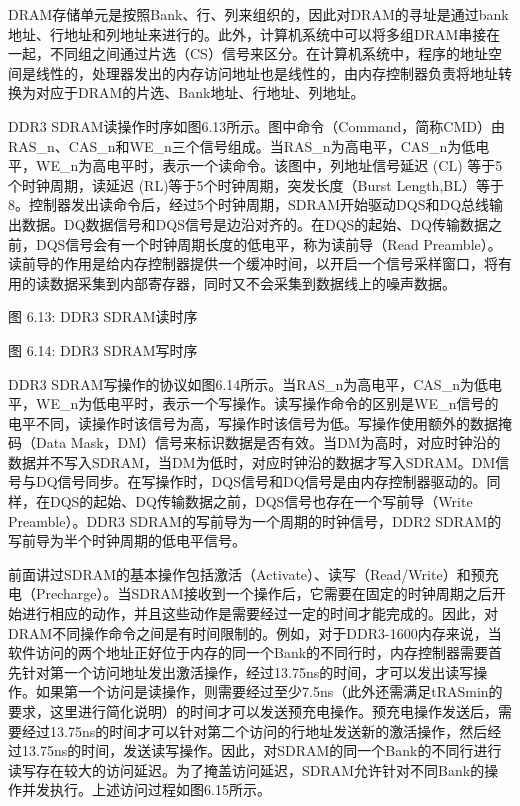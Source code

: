 \documentclass[]{ctexbook}
\begin{document}
DRAM存储单元是按照Bank、行、列来组织的，因此对DRAM的寻址是通过bank地址、行地址和列地址来进行的。此外，计算机系统中可以将多组DRAM串接在一起，不同组之间通过片选（CS）信号来区分。在计算机系统中，程序的地址空间是线性的，处理器发出的内存访问地址也是线性的，由内存控制器负责将地址转换为对应于DRAM的片选、Bank地址、行地址、列地址。

DDR3 SDRAM读操作时序如图6.13所示。图中命令（Command，简称CMD）由RAS\_n、CAS\_n和WE\_n三个信号组成。当RAS\_n为高电平，CAS\_n为低电平，WE\_n为高电平时，表示一个读命令。该图中，列地址信号延迟 (CL) 等于5个时钟周期，读延迟 (RL)等于5个时钟周期，突发长度（Burst Length,BL）等于8。控制器发出读命令后，经过5个时钟周期，SDRAM开始驱动DQS和DQ总线输出数据。DQ数据信号和DQS信号是边沿对齐的。在DQS的起始、DQ传输数据之前，DQS信号会有一个时钟周期长度的低电平，称为读前导（Read Preamble）。读前导的作用是给内存控制器提供一个缓冲时间，以开启一个信号采样窗口，将有用的读数据采集到内部寄存器，同时又不会采集到数据线上的噪声数据。

图 6.13: DDR3 SDRAM读时序

图 6.14: DDR3 SDRAM写时序

DDR3 SDRAM写操作的协议如图6.14所示。当RAS\_n为高电平，CAS\_n为低电平，WE\_n为低电平时，表示一个写操作。读写操作命令的区别是WE\_n信号的电平不同，读操作时该信号为高，写操作时该信号为低。写操作使用额外的数据掩码（Data Mask，DM）信号来标识数据是否有效。当DM为高时，对应时钟沿的数据并不写入SDRAM，当DM为低时，对应时钟沿的数据才写入SDRAM。DM信号与DQ信号同步。在写操作时，DQS信号和DQ信号是由内存控制器驱动的。同样，在DQS的起始、DQ传输数据之前，DQS信号也存在一个写前导（Write Preamble）。DDR3 SDRAM的写前导为一个周期的时钟信号，DDR2 SDRAM的写前导为半个时钟周期的低电平信号。

前面讲过SDRAM的基本操作包括激活（Activate）、读写（Read/Write）和预充电（Precharge）。当SDRAM接收到一个操作后，它需要在固定的时钟周期之后开始进行相应的动作，并且这些动作是需要经过一定的时间才能完成的。因此，对DRAM不同操作命令之间是有时间限制的。例如，对于DDR3-1600内存来说，当软件访问的两个地址正好位于内存的同一个Bank的不同行时，内存控制器需要首先针对第一个访问地址发出激活操作，经过13.75ns的时间，才可以发出读写操作。如果第一个访问是读操作，则需要经过至少7.5ns（此外还需满足tRASmin的要求，这里进行简化说明）的时间才可以发送预充电操作。预充电操作发送后，需要经过13.75ns的时间才可以针对第二个访问的行地址发送新的激活操作，然后经过13.75ns的时间，发送读写操作。因此，对SDRAM的同一个Bank的不同行进行读写存在较大的访问延迟。为了掩盖访问延迟，SDRAM允许针对不同Bank的操作并发执行。上述访问过程如图6.15所示。
\end{document}
